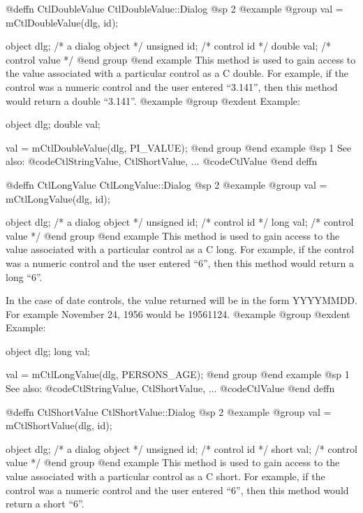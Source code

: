 @deffn {CtlDoubleValue} CtlDoubleValue::Dialog
@sp 2
@example
@group
val = mCtlDoubleValue(dlg, id);

object  dlg;    /*  a dialog object  */
unsigned id;    /*  control id       */
double  val;    /*  control value    */
@end group
@end example
This method is used to gain access to the value associated with a
particular control as a C double.  For example, if the control
was a numeric control and the user entered ``3.141'', then this method
would return a double ``3.141''.
@example
@group
@exdent Example:

object  dlg;
double  val;

val = mCtlDoubleValue(dlg, PI_VALUE);
@end group
@end example
@sp 1
See also:  @code{CtlStringValue, CtlShortValue, ...}
        @code{CtlValue}
@end deffn

















@deffn {CtlLongValue} CtlLongValue::Dialog
@sp 2
@example
@group
val = mCtlLongValue(dlg, id);

object  dlg;    /*  a dialog object  */
unsigned id;    /*  control id       */
long    val;    /*  control value    */
@end group
@end example
This method is used to gain access to the value associated with a
particular control as a C long.  For example, if the control
was a numeric control and the user entered ``6'', then this method
would return a long ``6''.

In the case of date controls, the value returned will be in the
form YYYYMMDD.  For example November 24, 1956 would be
19561124.
@example
@group
@exdent Example:

object  dlg;
long    val;

val = mCtlLongValue(dlg, PERSONS_AGE);
@end group
@end example
@sp 1
See also:  @code{CtlStringValue, CtlShortValue, ...}
        @code{CtlValue}
@end deffn














@deffn {CtlShortValue} CtlShortValue::Dialog
@sp 2
@example
@group
val = mCtlShortValue(dlg, id);

object  dlg;    /*  a dialog object  */
unsigned id;    /*  control id       */
short   val;    /*  control value    */
@end group
@end example
This method is used to gain access to the value associated with a
particular control as a C short.  For example, if the control
was a numeric control and the user entered ``6'', then this method
would return a short ``6''.

